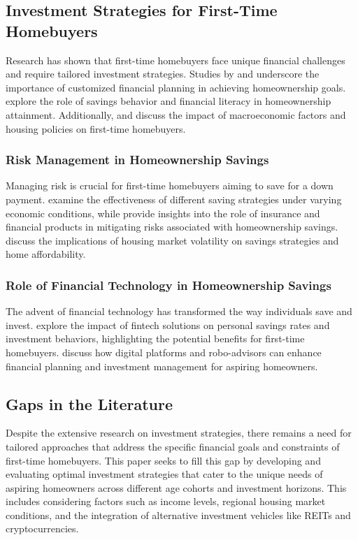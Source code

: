 \subsection{Investment Strategies for First-Time Homebuyers}
Research has shown that first-time homebuyers face unique financial challenges and require tailored investment strategies. Studies by \citet{brueckner2012strategic} and \citet{dietz2003effects} underscore the importance of customized financial planning in achieving homeownership goals. \citet{lee2013savings} explore the role of savings behavior and financial literacy in homeownership attainment. Additionally, \citet{goodman2018accessing} and \citet{mcwilliams2017assessing} discuss the impact of macroeconomic factors and housing policies on first-time homebuyers.

\subsubsection{Risk Management in Homeownership Savings}
Managing risk is crucial for first-time homebuyers aiming to save for a down payment. \citet{baker2010down} examine the effectiveness of different saving strategies under varying economic conditions, while \citet{mason2013risk} provide insights into the role of insurance and financial products in mitigating risks associated with homeownership savings. \citet{rosen2005housing} discuss the implications of housing market volatility on savings strategies and home affordability.

\subsubsection{Role of Financial Technology in Homeownership Savings}
The advent of financial technology has transformed the way individuals save and invest. \citet{phillips2019fintech} explore the impact of fintech solutions on personal savings rates and investment behaviors, highlighting the potential benefits for first-time homebuyers. \citet{gomber2018digital} discuss how digital platforms and robo-advisors can enhance financial planning and investment management for aspiring homeowners.

\subsection{Gaps in the Literature}
Despite the extensive research on investment strategies, there remains a need for tailored approaches that address the specific financial goals and constraints of first-time homebuyers. This paper seeks to fill this gap by developing and evaluating optimal investment strategies that cater to the unique needs of aspiring homeowners across different age cohorts and investment horizons. This includes considering factors such as income levels, regional housing market conditions, and the integration of alternative investment vehicles like REITs and cryptocurrencies.

\newpage
